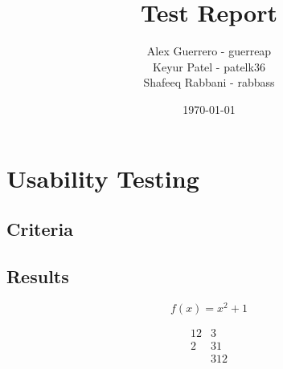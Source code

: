 \documentclass{article}
\begin{document}
\title{Test Report}
\author{Alex Guerrero - guerreap\\Keyur Patel - patelk36\\Shafeeq Rabbani - rabbass}
\date{\today}
\maketitle

\section{Usability Testing}
\subsection{Criteria}
\subsection{Results}

\begin{equation}
f(x) = x^2 + 1
\end{equation}

\begin{align*}
1	2	&3\\
2	&3	1\\
&3	1	2
\end{align*}




\end{document}
